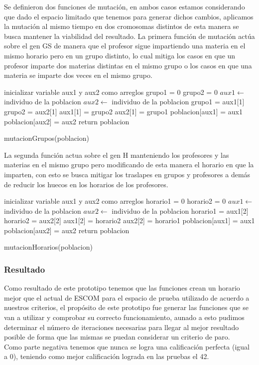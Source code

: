 Se definieron dos funciones de mutación, en ambos casos estamos considerando que dado el espacio limitado que tenemos para generar dichos cambios, aplicamos la mutación al mismo tiempo en dos cromosomas distintos de esta manera se busca mantener la viabilidad del resultado. La primera función de mutación  actúa sobre el gen GS de manera que el profesor sigue impartiendo una materia en el mismo horario pero en un grupo distinto, lo cual mitiga los casos en que un profesor imparte dos materias distintas en el mismo grupo o los casos en que una materia se imparte dos veces en el mismo grupo.\\ 


\begin{algorithm}[H]
	\DontPrintSemicolon
	\SetAlgoLined
	inicializar variable aux1 y aux2 como arreglos\;
	grupo1 = 0\;
	grupo2 = 0\;
	$aux1 \leftarrow $ individuo de la poblacion\;
	$aux2 \leftarrow $ individuo de la poblacion\;
	grupo1 = aux1[1]\;
	grupo2 = aux2[1]\;
	aux1[1] = grupo2\;
	aux2[1] = grupo1\;
	poblacion[aux1] = aux1\;
	poblacion[aux2] = aux2\;
	return poblacion \;
	\caption{mutacionGrupos(poblacion)}
\end{algorithm}

La segunda función actua sobre el gen H manteniendo los profesores y las materias en el mismo grupo pero modificando de esta manera el horario en que la imparten, con esto se busca mitigar los traslapes en grupos y profesores a demás de reducir los huecos en los horarios de los profesores.\\

\begin{algorithm}[H]
	\DontPrintSemicolon
	\SetAlgoLined
	inicializar variable aux1 y aux2 como arreglos\;
	horario1 = 0\;
	horario2 = 0\;
	$aux1 \leftarrow $ individuo de la poblacion\;
	$aux2 \leftarrow $ individuo de la poblacion\;
	horario1 = aux1[2]\;
	horario2 = aux2[2]\;
	aux1[2] = horario2\;
	aux2[2] = horario1\;
	poblacion[aux1] = aux1\;
	poblacion[aux2] = aux2\;
	return poblacion \;
	\caption{mutacionHorarios(poblacion)}
	\end{algorithm}  

\subsubsection{Resultado}

Como resultado de este prototipo tenemos que las funciones crean un horario mejor que el actual de ESCOM para el espacio de prueba utilizado de acuerdo a nuestros criterios, el propósito de este prototipo fue generar las funciones que se van a utilizar y comprobar su correcto funcionamiento, aunado a esto pudimos determinar el número de iteraciones necesarias para llegar al mejor resultado posible de forma que las mismas se puedan considerar un criterio de paro.\\

Como parte negativa tenemos que nunca se logra una calificación perfecta (igual a 0), teniendo como mejor calificación lograda en las pruebas el 42.\\